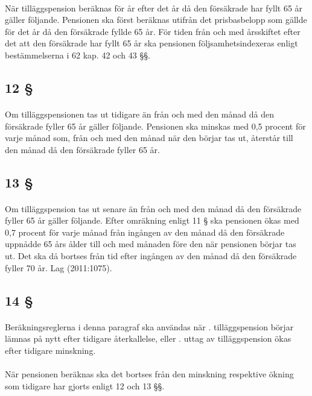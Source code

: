 \documentclass[a4paper,notitlepage,openany,10pt]{book}
\begin{document}
\paragraph*{}
När tilläggspension beräknas för år efter det år då den försäkrade har fyllt 65 år gäller följande. Pensionen ska först beräknas utifrån det prisbasbelopp som gällde för det år då den försäkrade fyllde 65 år. För tiden från och med årsskiftet efter det att den försäkrade har fyllt 65 år ska pensionen följsamhetsindexeras enligt bestämmelserna i 62 kap. 42 och 43 §§.
\subsection*{12 §}
\paragraph*{}
Om tilläggspensionen tas ut tidigare än från och med den månad då den försäkrade fyller 65 år gäller följande.
Pensionen ska minskas med 0,5 procent för varje månad som, från och med den månad när den börjar tas ut, återstår till den månad då den försäkrade fyller 65 år.
\subsection*{13 §}
\paragraph*{}
Om tilläggspension tas ut senare än från och med den månad då den försäkrade fyller 65 år gäller följande. Efter omräkning enligt 11 § ska pensionen ökas med 0,7 procent för varje månad från ingången av den månad då den försäkrade uppnådde 65 års ålder till och med månaden före den när pensionen börjar tas ut. Det ska då bortses från tid efter ingången av den månad då den försäkrade fyller 70 år.
Lag (2011:1075).
\subsection*{14 §}
\paragraph*{}
Beräkningsreglerna i denna paragraf ska användas när
. tilläggspension börjar lämnas på nytt efter tidigare återkallelse, eller
. uttag av tilläggspension ökas efter tidigare minskning.
\paragraph*{}
När pensionen beräknas ska det bortses från den minskning respektive ökning som tidigare har gjorts enligt 12 och 13 §§.
\end{document}
